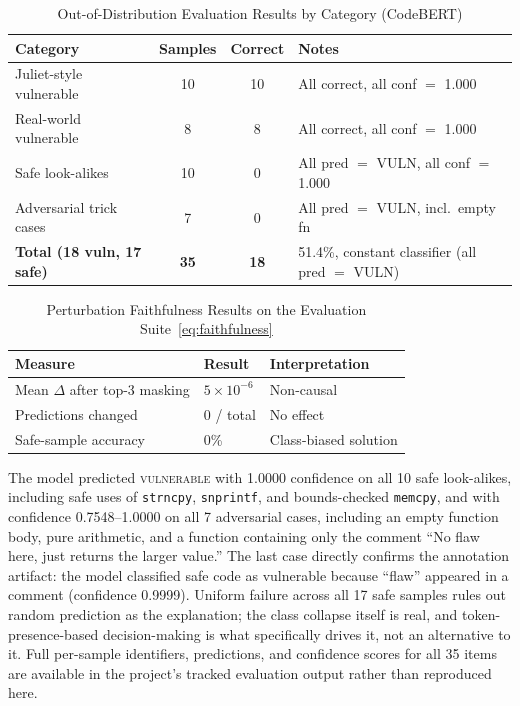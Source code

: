 \documentclass{ieeeaccess}
\begin{document}
\begin{table}[t]
\centering
\caption{Out-of-Distribution Evaluation Results by Category (CodeBERT)}
\label{tab:ood}
\begin{tabular}{@{}lccp{}@{}}
\toprule
\textbf{Category} & \textbf{Samples} & \textbf{Correct} & \textbf{Notes} \\
\midrule
Juliet-style vulnerable & 10 & 10 & All correct, all conf $=$ 1.000 \\
Real-world vulnerable   & 8  & 8  & All correct, all conf $=$ 1.000 \\
Safe look-alikes        & 10 & 0  & All pred $=$ VULN, all conf $=$ 1.000 \\
Adversarial trick cases & 7  & 0  & All pred $=$ VULN, incl.\ empty fn \\
\midrule
\textbf{Total (18 vuln, 17 safe)} & \textbf{35} & \textbf{18} & 51.4\%, constant classifier (all pred $=$ VULN) \\
\bottomrule
\end{tabular}
\end{table}

\begin{table}[t]
\centering
\caption{Perturbation Faithfulness Results on the Evaluation Suite~\eqref{eq:faithfulness}}
\label{tab:faithfulness}
\begin{tabular}{@{}lll@{}}
\toprule
\textbf{Measure} & \textbf{Result} & \textbf{Interpretation} \\
\midrule
Mean $\Delta$ after top-3 masking & $5\times10^{-6}$ & Non-causal \\
Predictions changed               & 0 / total       & No effect \\
Safe-sample accuracy              & 0\%             & Class-biased solution \\
\bottomrule
\end{tabular}
\end{table}

The model predicted \textsc{vulnerable} with 1.0000 confidence on all 10 safe look-alikes, including safe uses of \texttt{strncpy}, \texttt{snprintf}, and bounds-checked \texttt{memcpy}, and with confidence 0.7548--1.0000 on all 7 adversarial cases, including an empty function body, pure arithmetic, and a function containing only the comment ``No flaw here, just returns the larger value.'' The last case directly confirms the annotation artifact: the model classified safe code as vulnerable because ``flaw'' appeared in a comment (confidence 0.9999). Uniform failure across all 17 safe samples rules out random prediction as the explanation; the class collapse itself is real, and token-presence-based decision-making is what specifically drives it, not an alternative to it. Full per-sample identifiers, predictions, and confidence scores for all 35 items are available in the project's tracked evaluation output rather than reproduced here.
\end{document}
